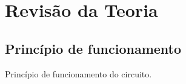 \newpage
\section{Revisão da Teoria}
\subsection{Princípio de funcionamento}
Princípio de funcionamento do circuito.
